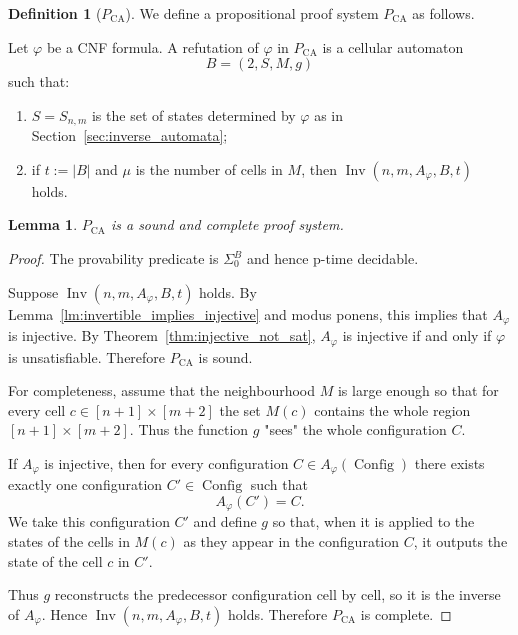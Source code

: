 \documentclass{article}
\theoremstyle{plain}
\newtheorem{lemma}[theorem]{Lemma}
\theoremstyle{definition}
\newtheorem{definition}[theorem]{Definition}
\DeclareMathOperator{\Config}{Config}
\DeclareMathOperator{\Inv}{Inv}
\begin{document}
\begin{definition}[$P_{\mathrm{CA}}$]
We define a propositional proof system $P_{\mathrm{CA}}$ as follows.

Let $\varphi$ be a CNF formula. A refutation of $\varphi$ in $P_{\mathrm{CA}}$ is a cellular automaton
\[
B = (2,S,M,g)
\]
such that:
\begin{enumerate}
    \item $S = S_{n,m}$ is the set of states determined by $\varphi$ as in Section~\ref{sec:inverse_automata};
    \item if $t := |B|$ and  $\mu$ is the number of cells in $M$, then $\Inv(n,m,A_\varphi,B,t)$ holds.
\end{enumerate}
\end{definition}


\begin{lemma}
   $P_{\mathrm{CA}}$  is a sound and complete proof system.
\end{lemma}
\begin{proof}
    The provability predicate is $\Sigma^B_0$ and hence p-time decidable.

    Suppose $\Inv(n,m,A_\varphi,B,t)$ holds.
    By Lemma~\ref{lm:invertible_implies_injective} and modus ponens,
    this implies that $A_\varphi$ is injective.
    By Theorem~\ref{thm:injective_not_sat}, $A_\varphi$ is injective
    if and only if $\varphi$ is unsatisfiable.
    Therefore $P_{\mathrm{CA}}$ is sound.


For completeness, assume that the neighbourhood $M$ is large enough so that
for every cell $c \in[n+1]\times[m+2]$ the set $M(c)$ contains the whole
region $[n+1]\times[m+2]$. Thus the function $g$ "sees" the whole configuration
$C$.

If $A_\varphi$ is injective, then for every configuration $C \in A_\varphi(\Config)$ there exists
exactly one configuration $C'\in \Config$ such that
\[
A_\varphi(C') = C .
\]
We take this configuration $C'$ and define $g$ so that,
when it is applied to the states of the cells in $M(c)$ as they
appear in the configuration $C$, it outputs the state of the
cell $c$ in $C'$.

Thus $g$ reconstructs the predecessor configuration cell by cell,
so it is the inverse of $A_\varphi$. Hence $\Inv(n,m,A_\varphi,B,t)$ holds. Therefore $P_{\mathrm{CA}}$ is complete.
\end{proof}
\end{document}
